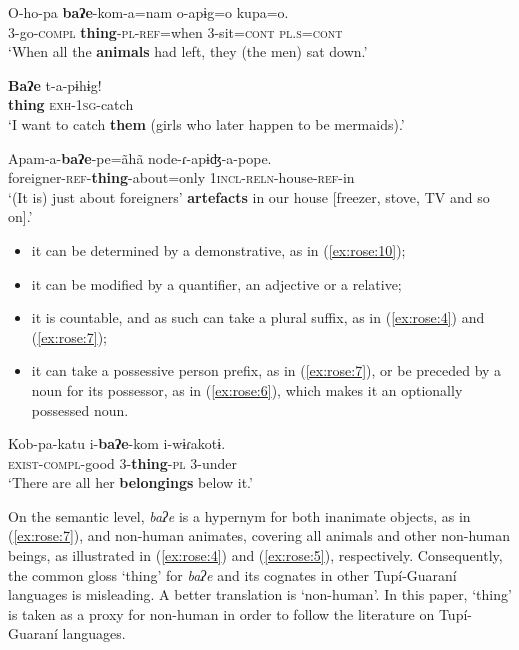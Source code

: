 \documentclass[output=paper]{langscibook}
\begin{document}
\ea \label{ex:rose:4}
\gll O-ho-pa  \textbf{baʔe}-kom-a=nam  o-apɨg=o  kupa=o.\\
3-go-\textsc{compl}  \textbf{thing}-\textsc{pl}{}-\textsc{ref}=when  3-sit=\textsc{cont}  \textsc{pl}.\textsc{s}=\textsc{cont}\\
\glt ‘When all the \textbf{animals} had left, they (the men) sat down.’ 
\z 

\ea \label{ex:rose:5}
\gll \textbf{Baʔe}   t-a-pɨhɨg!\\
\textbf{thing}   \textsc{exh-1sg-}catch\\
\glt ‘I want to catch \textbf{them} (girls who later happen to be mermaids).’ 
\z 

\ea \label{ex:rose:6}
\gll Apam-a-\textbf{baʔe}{}-pe=ãhã      node-ɾ{}-apɨʤ-a-pope.\\
foreigner-\textsc{ref}{}-\textbf{thing}{}-about=only  \textsc{1incl-reln}{}-house-\textsc{ref}{}-in\\
\glt  ‘(It is) just about foreigners’ \textbf{artefacts} in our house [freezer, stove, TV and so on].’ 
\z 

\begin{itemize}
\item it can be determined by a demonstrative, as in (\ref{ex:rose:10});  
\item it can be modified by a quantifier, an adjective or a relative;
\item it is countable, and as such can take a plural suffix, as in (\ref{ex:rose:4}) and (\ref{ex:rose:7}); 
\item it can take a possessive person prefix, as in (\ref{ex:rose:7}), or be preceded by a noun for its possessor, as in (\ref{ex:rose:6}), which makes it an optionally possessed noun.
\end{itemize}

\ea \label{ex:rose:7}
\gll Kob-pa-katu  i-\textbf{baʔe}{}-kom  i-wɨɾakotɨ.\\
\textsc{exist}{}-\textsc{compl}{}-good  3-\textbf{thing}{}-\textsc{pl}  3-under\\
\glt ‘There are all her \textbf{belongings} below it.’ 
\z 

On the semantic level, \textit{baʔe} is a hypernym for both inanimate objects, as in (\ref{ex:rose:7}), and non-human animates, covering all animals and other non-human beings, as illustrated in (\ref{ex:rose:4}) and (\ref{ex:rose:5}), respectively. Consequently, the common gloss ‘thing’ for \textit{baʔe} and its cognates in other Tupí-Guaraní languages is misleading. A better translation is ‘non-human’. In this paper, ‘thing’ is taken as a proxy for non-human in order to follow the literature on Tupí-Guaraní languages.
\end{document}
